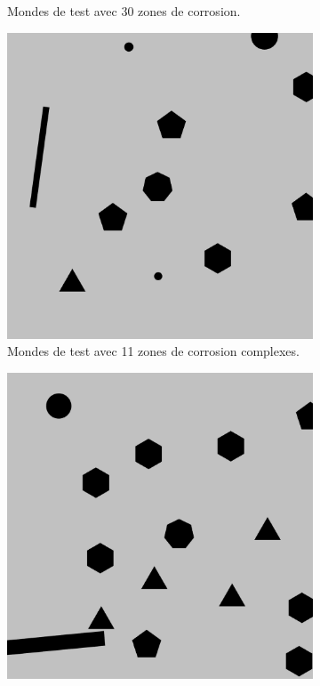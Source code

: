 \documentclass[english,RandD]{rapportPFE}  %
\begin{document}
\begin{figure}[H]
\begin{subfigure}[t]{0.15\linewidth}
				\caption{Mondes de test avec 30 zones de corrosion.}
				\label{fig:test_model_30_1}
			\end{subfigure}
			\hfill
			\begin{subfigure}[t]{0.15\linewidth}
					\includegraphics[width=\linewidth]{graphics/test_model_11_complex_1.png}
					\caption{Mondes de test avec 11 zones de corrosion complexes.}
					\label{fig:test_model_11_complex_1}
			\end{subfigure}
			\hfill
			\begin{subfigure}[t]{0.15\linewidth}
				\centering
				\includegraphics[width=\linewidth]{graphics/test_model_15_complex_1.png}

\end{subfigure}
\end{figure}
\end{document}
